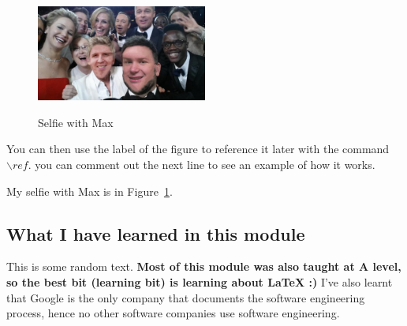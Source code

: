 \begin{figure}[h]
\caption{Selfie with Max}
\centering
\includegraphics[width=0.5\textwidth]{Faces.jpg}
\label{fig:selfie}
\end{figure}

You can then use the label of the figure to reference it later with the command ${\backslash}ref$. you can comment out the next line to see an example of how it works.

My selfie with Max is in  Figure~\ref{fig:selfie}.

\subsection{What I have learned in this module}
This is some random text.
\textbf{Most of this module was also taught at A level, so the best bit (learning bit) is learning about LaTeX :)}
I've also learnt that Google is the only company that documents the software engineering process, hence no other software companies use software engineering.

